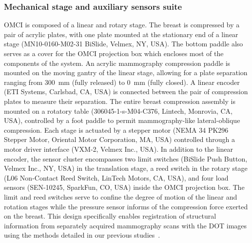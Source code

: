 \subsubsection{Mechanical stage and auxiliary sensors suite}
\ac{OMCI} is composed of a linear and rotary stage. The breast is compressed by a pair of acrylic plates, with one plate mounted at the stationary end of a linear stage (MN10-0160-M02-31 BiSlide, Velmex, NY, USA). The bottom paddle also serves as a cover for the \ac{OMCI} projection box which encloses most of the components of the system. An acrylic mammography compression paddle is mounted on the moving gantry of the linear stage, allowing for a plate separation ranging from 300~mm (fully released) to 0~mm (fully closed). A linear encoder (ETI Systems, Carlsbad, CA, USA) is connected between the pair of compression plates to measure their separation. The entire breast compression assembly is mounted on a rotatory table (306045-1-s-M04-C376, Lintech, Monrovia, CA, USA), controlled by a foot paddle to permit mammography-like lateral-oblique compression. Each stage is actuated by a stepper motor (NEMA 34 PK296 Stepper Motor, Oriental Motor Corporation, MA, USA) controlled through a motor driver interface (VXM-2, Velmex Inc., USA). In addition to the linear encoder, the sensor cluster encompasses two limit switches (BiSlide Push Button, Velmex Inc., NY, USA) in the translation stage, a reed switch in the rotary stage (L06 Non-Contact Reed Switch, LinTech Motors, CA, USA), and four load sensors (SEN-10245, SparkFun, CO, USA) inside the \ac{OMCI} projection box. The limit and reed switches serve to confine the degree of motion of the linear and rotation stages while the pressure sensor informs of the compression force exerted on the breast. This design specifically enables registration of structural information from separately acquired mammography scans with the \ac{DOT} images using the methods detailed in our previous studies~\cite{Deng2015}.

